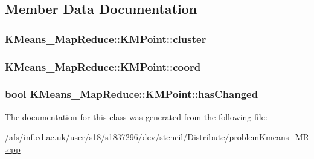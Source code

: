 \subsection{Member Data Documentation}
\hypertarget{classKMeans__MapReduce_1_1KMPoint_ab0bfe9fb7282a263de59729e3bc0542e}{
\subsubsection[{cluster}]{ K\-Means\-\_\-\-Map\-Reduce\-::\-K\-M\-Point\-::cluster}}\label{classKMeans__MapReduce_1_1KMPoint_ab0bfe9fb7282a263de59729e3bc0542e}
\hypertarget{classKMeans__MapReduce_1_1KMPoint_ac824c320dce8a7a73e6e24a1fb116b69}{
\subsubsection[{coord}]{ K\-Means\-\_\-\-Map\-Reduce\-::\-K\-M\-Point\-::coord}}\label{classKMeans__MapReduce_1_1KMPoint_ac824c320dce8a7a73e6e24a1fb116b69}
\hypertarget{classKMeans__MapReduce_1_1KMPoint_a41e063ff13aab49111c9110f9f8c9f5f}{
\subsubsection[{has\-Changed}]{\setlength{\rightskip}{0pt plus 5cm}bool K\-Means\-\_\-\-Map\-Reduce\-::\-K\-M\-Point\-::has\-Changed}}\label{classKMeans__MapReduce_1_1KMPoint_a41e063ff13aab49111c9110f9f8c9f5f}


The documentation for this class was generated from the following file\-:\begin{DoxyCompactItemize}
\item 
/afs/inf.\-ed.\-ac.\-uk/user/s18/s1837296/dev/stencil/\-Distribute/\hyperlink{problemKmeans__MR_8cpp}{problem\-Kmeans\-\_\-\-M\-R.\-cpp}\end{DoxyCompactItemize}
